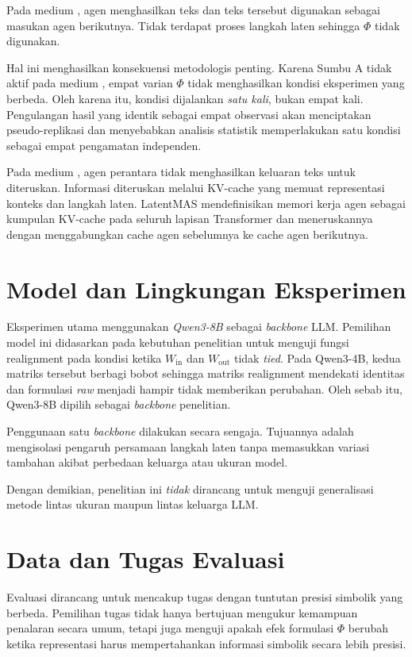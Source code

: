 Pada medium , agen menghasilkan teks dan teks tersebut digunakan sebagai masukan agen berikutnya. Tidak terdapat proses langkah laten sehingga \(\Phi\) tidak digunakan.

Hal ini menghasilkan konsekuensi metodologis penting. Karena Sumbu A tidak aktif pada medium , empat varian \(\Phi\) tidak menghasilkan kondisi eksperimen yang berbeda. Oleh karena itu, kondisi  dijalankan \textit{satu kali}, bukan empat kali. Pengulangan hasil yang identik sebagai empat observasi akan menciptakan pseudo-replikasi dan menyebabkan analisis statistik memperlakukan satu kondisi sebagai empat pengamatan independen.

Pada medium , agen perantara tidak menghasilkan keluaran teks untuk diteruskan. Informasi diteruskan melalui KV-cache yang memuat representasi konteks dan langkah laten. LatentMAS mendefinisikan memori kerja agen sebagai kumpulan KV-cache pada seluruh lapisan Transformer dan meneruskannya dengan menggabungkan cache agen sebelumnya ke cache agen berikutnya.

\section{Model dan Lingkungan Eksperimen}

Eksperimen utama menggunakan \textit{Qwen3-8B} sebagai \textit{backbone} LLM. Pemilihan model ini didasarkan pada kebutuhan penelitian untuk menguji fungsi realignment pada kondisi ketika \(W_{\mathrm{in}}\) dan \(W_{\mathrm{out}}\) tidak \textit{tied}. Pada Qwen3-4B, kedua matriks tersebut berbagi bobot sehingga matriks realignment mendekati identitas dan formulasi \textit{raw} menjadi hampir tidak memberikan perubahan. Oleh sebab itu, Qwen3-8B dipilih sebagai \textit{backbone} penelitian.

Penggunaan satu \textit{backbone} dilakukan secara sengaja. Tujuannya adalah mengisolasi pengaruh persamaan langkah laten tanpa memasukkan variasi tambahan akibat perbedaan keluarga atau ukuran model.

Dengan demikian, penelitian ini \textit{tidak} dirancang untuk menguji generalisasi metode lintas ukuran maupun lintas keluarga LLM.

\section{Data dan Tugas Evaluasi}

Evaluasi dirancang untuk mencakup tugas dengan tuntutan presisi simbolik yang berbeda. Pemilihan tugas tidak hanya bertujuan mengukur kemampuan penalaran secara umum, tetapi juga menguji apakah efek formulasi \(\Phi\) berubah ketika representasi harus mempertahankan informasi simbolik secara lebih presisi.


